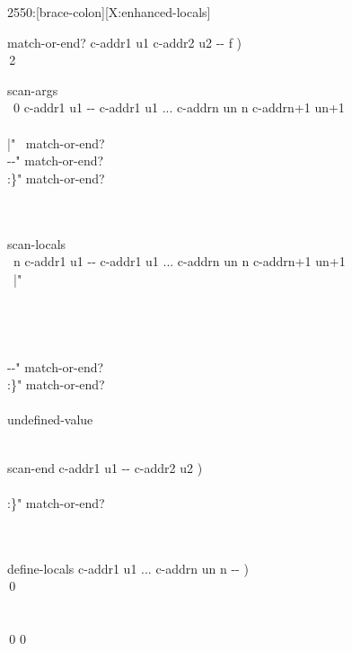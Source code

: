 \begin{worddef}[b:]{2550}{\brace:}[brace-colon][X:enhanced-locals]
\begin{implement}
\word{:} match-or-end?  c-addr1 u1 c-addr2 u2 -{}- f ) \\
\tab\,2        \word{;}

\word{:} scan-args \\
\tab\, 0 c-addr1 u1 -{}- c-addr1 u1 ... c-addrn un n c-addrn+1 un+1\\
\tab\, \\
\tab[2]	  |"   ~match-or-end?   \\
\tab[2]	  -{}-" match-or-end?   \\
\tab[2]	  :\}"  match-or-end?   \\
\tab[2]	   \\
\tab\,    \word{;}

\word{:} scan-locals \\
\tab\, n c-addr1 u1 -{}- c-addr1 u1 ... c-addrn un n c-addrn+1 un+1 \\
\tab\,  |"     \\
\tab[2]	 \\
\tab\, \\
\tab\,  \\
\tab\, \\
\tab[2]	  -{}-" match-or-end?   \\
\tab[2]	  :\}"  match-or-end?   \\
\tab[2]	   \\
\tab[2]	 undefined-value \\
\tab\,   \word{;}

\word{:} scan-end  c-addr1 u1 -{}- c-addr2 u2 ) \\
\tab\, \\
\tab[2]	  :\}" match-or-end?   \\
\tab[2]	  \\
\tab\, \word{;}

\word{:} define-locals  c-addr1 u1 ... c-addrn un n -{}- ) \\
\tab\,0  \\
\tab[2]	 \\
\tab\, \\
\tab\,0 0  \word{;}


\end{implement}
\end{worddef}
